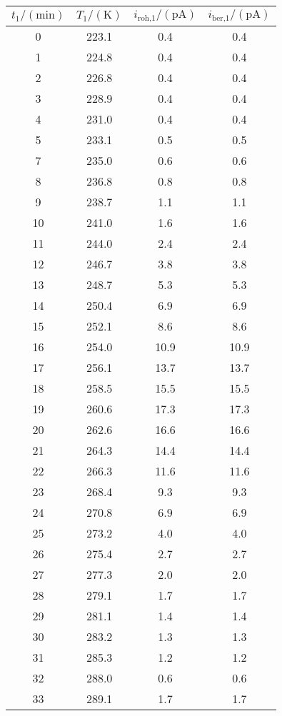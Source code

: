 \label{tab:tabData1}
	\begin{tabular}{S[table-format=2.0]S[table-format=3.1]S[table-format=2.1]S[table-format=2.1]}
		\toprule
		{$t_\text{1}/(\si{\minute})$} & {$T_\text{1}/(\si{\kelvin})$} & {$i_\text{roh,1}/(\si{\pico\ampere})$} & {$i_\text{ber,1}/(\si{\pico\ampere})$} \\
		 & 223.1 & 0.4 & 0.4 \\
		 1 & 224.8 & 0.4 & 0.4 \\
		 2 & 226.8 & 0.4 & 0.4 \\
		 3 & 228.9 & 0.4 & 0.4 \\
		 4 & 231.0 & 0.4 & 0.4 \\
		 5 & 233.1 & 0.5 & 0.5 \\
		 7 & 235.0 & 0.6 & 0.6 \\
		 8 & 236.8 & 0.8 & 0.8 \\
		 9 & 238.7 & 1.1 & 1.1 \\
		10 & 241.0 & 1.6 & 1.6 \\
		11 & 244.0 & 2.4 & 2.4 \\
		12 & 246.7 & 3.8 & 3.8 \\
		13 & 248.7 & 5.3 & 5.3 \\
		14 & 250.4 & 6.9 & 6.9 \\
		15 & 252.1 & 8.6 & 8.6 \\
		16 & 254.0 & 10.9 & 10.9 \\
		17 & 256.1 & 13.7 & 13.7 \\
		18 & 258.5 & 15.5 & 15.5 \\
		19 & 260.6 & 17.3 & 17.3 \\
		20 & 262.6 & 16.6 & 16.6 \\
		21 & 264.3 & 14.4 & 14.4 \\
		22 & 266.3 & 11.6 & 11.6 \\
		23 & 268.4 & 9.3 & 9.3 \\
		24 & 270.8 & 6.9 & 6.9 \\
		25 & 273.2 & 4.0 & 4.0 \\
		26 & 275.4 & 2.7 & 2.7 \\
		27 & 277.3 & 2.0 & 2.0 \\
		28 & 279.1 & 1.7 & 1.7 \\
		29 & 281.1 & 1.4 & 1.4 \\
		30 & 283.2 & 1.3 & 1.3 \\
		31 & 285.3 & 1.2 & 1.2 \\
		32 & 288.0 & 0.6 & 0.6 \\
		33 & 289.1 & 1.7 & 1.7 \\

\end{tabular}
